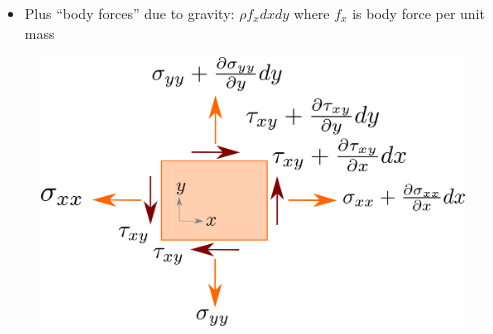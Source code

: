 \documentclass[beamer]{beamer}
\begin{document}
\begin{frame}
{\begin{minipage}[t]{0.48\linewidth}
\begin{itemize}
		\item Plus ``body forces'' due to gravity: $\rho f_x dx dy$ where $f_x$ is body force per unit mass
	\end{itemize}
 \end{minipage}%
 \hfill%
 \begin{minipage}[t]{0.48\linewidth}
 	\begin{figure}
 		\includegraphics[width=\linewidth]{figs/equilibrium-finished.pdf}
 	\end{figure}
 \end{minipage}
}
\end{frame}
\end{document}
